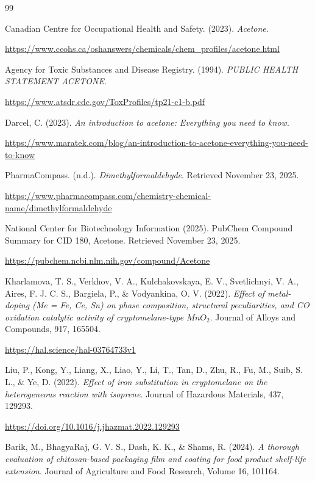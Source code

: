\documentclass{article} %
\begin{document}
\begin{thebibliography}{99}

Canadian Centre for Occupational Health and Safety. (2023).  
\textit{Acetone}.

\url{https://www.ccohs.ca/oshanswers/chemicals/chem_profiles/acetone.html}

Agency for Toxic Substances and Disease Registry. (1994).  
\textit{PUBLIC HEALTH STATEMENT
ACETONE}.

\url{https://www.atsdr.cdc.gov/ToxProfiles/tp21-c1-b.pdf}

Darcel, C. (2023).  
\textit{An introduction to acetone: Everything you need to know}.

\url{https://www.maratek.com/blog/an-introduction-to-acetone-everything-you-need-to-know}

PharmaCompass. (n.d.).  
\textit{Dimethylformaldehyde}. Retrieved November 23, 2025.

\url{https://www.pharmacompass.com/chemistry-chemical-name/dimethylformaldehyde}

National Center for Biotechnology Information (2025). PubChem Compound Summary for CID 180, Acetone. Retrieved November 23, 2025.

\url{https://pubchem.ncbi.nlm.nih.gov/compound/Acetone}

Kharlamova, T. S., Verkhov, V. A., Kulchakovskaya, E. V., Svetlichnyi, V. A., Aires, F. J. C. S., Bargiela, P., \& Vodyankina, O. V. (2022). \textit{Effect of metal-doping (Me = Fe, Ce, Sn) on phase composition, structural peculiarities, and CO oxidation catalytic activity of cryptomelane-type $MnO_{2}$}. Journal of Alloys and Compounds, 917, 165504.

\url{https://hal.science/hal-03764733v1}

Liu, P., Kong, Y., Liang, X., Liao, Y., Li, T., Tan, D., Zhu, R., Fu, M., Suib, S. L., \& Ye, D. (2022). \textit{Effect of iron substitution in cryptomelane on the heterogeneous reaction with isoprene}. Journal of Hazardous Materials, 437, 129293.

\url{https://doi.org/10.1016/j.jhazmat.2022.129293}

Barik, M., BhagyaRaj, G. V. S., Dash, K. K., \& Shams, R. (2024). \textit{A thorough evaluation of chitosan-based packaging film and coating for food product shelf-life extension}. Journal of Agriculture and Food Research, Volume 16, 101164.


\end{thebibliography}
\end{document}
